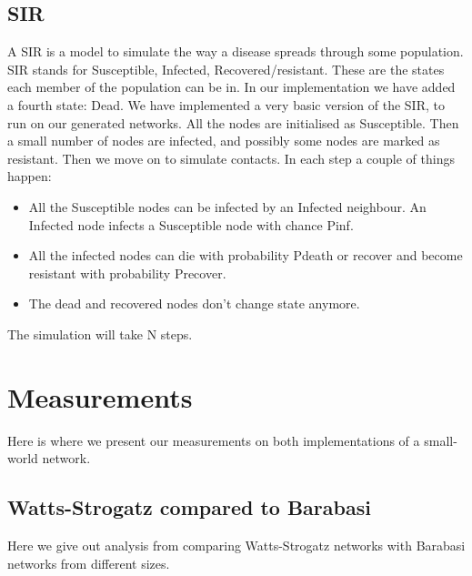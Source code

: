 \documentclass[a4paper]{article}
\theoremstyle{definition}
\begin{document}
\newpage
\subsection{SIR}
A SIR is a model to simulate the way a disease spreads through some population. SIR stands for Susceptible, Infected, Recovered/resistant. These are the states each member of the population can be in. In our implementation we have added a fourth state: Dead. 
We have implemented a very basic version of the SIR, to run on our generated networks. 
All the nodes are initialised as Susceptible. Then a small number of nodes
are infected, and possibly some nodes are marked as resistant. Then we move
on to simulate contacts. In each step a couple of things happen:\\

\begin{itemize}
  \item All the Susceptible nodes can be infected by an Infected neighbour. An Infected node infects a Susceptible node with chance Pinf.
  \item All the infected nodes can die with probability Pdeath or recover and become resistant with probability Precover. 
  \item The dead and recovered nodes don't change state anymore.
\end{itemize}

The simulation will take N steps. 

\newpage
\section{Measurements}
Here is where we present our measurements on both implementations of a
small-world network.\\
\subsection{Watts-Strogatz compared to Barabasi}
Here we give out analysis from comparing Watts-Strogatz networks with
Barabasi networks from different sizes.\\
\end{document}
